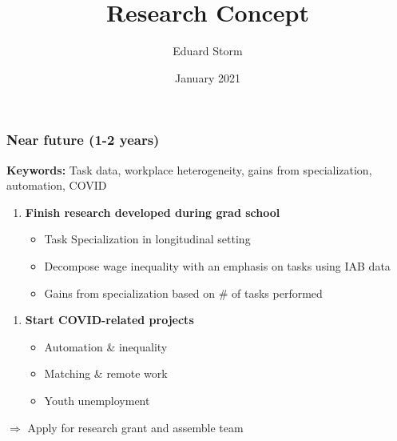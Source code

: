 \documentclass[10pt]{beamer}
\title[Research]{Research Concept} %
\author{Eduard Storm} %
\institute[estorm@carleton.edu]
{
	
	
	\medskip 
	
	
	
	
}
\date{January 2021} %
\begin{document}
\begin{frame}
\titlepage %
\end{frame}


\begin{frame} 
	\frametitle{Near future (1-2 years)}

\textbf{Keywords:} Task data, workplace heterogeneity, gains from specialization, automation, COVID

\bigskip
	
\begin{enumerate}
	\item \textbf{Finish research developed during grad school}
		\begin{itemize}
			\item Task Specialization in longitudinal setting
			\item Decompose wage inequality with an emphasis on tasks using IAB data
			\item Gains from specialization based on \# of tasks performed
		\end{itemize}
\end{enumerate}	

\bigskip

\begin{enumerate}
	\item \textbf{Start COVID-related projects}
	\begin{itemize}
		\item Automation \& inequality
		\item Matching \& remote work
		\item Youth unemployment
	\end{itemize}
\end{enumerate}
	
\bigskip

$\Longrightarrow$ Apply for research grant and assemble team	
	
\end{frame}
\end{document}
